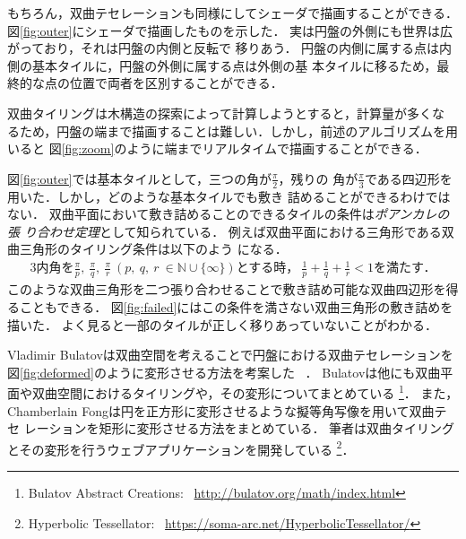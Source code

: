 もちろん，双曲テセレーションも同様にしてシェーダで描画することができる．
図\ref{fig:outer}にシェーダで描画したものを示した．
実は円盤の外側にも世界は広がっており，それは円盤の内側と反転で
移りあう．
円盤の内側に属する点は内側の基本タイルに，円盤の外側に属する点は外側の基
本タイルに移るため，最終的な点の位置で両者を区別することができる．

双曲タイリングは木構造の探索によって計算しようとすると，計算量が多くな
るため，円盤の端まで描画することは難しい．しかし，前述のアルゴリズムを用いると
図\ref{fig:zoom}のように端までリアルタイムで描画することができる．

図\ref{fig:outer}では基本タイルとして，三つの角が$\frac{\pi}{2}$，残りの
角が$\frac{\pi}{3}$である四辺形を用いた．しかし，どのような基本タイルでも敷き
詰めることができるわけではない．
双曲平面において敷き詰めることのできるタイルの条件は\emph{ポアンカレの張
り合わせ定理}として知られている．
例えば双曲平面における三角形である双曲三角形のタイリング条件は以下のよう
になる．
\begin{eqnarray*}
3\text{内角を}\frac{\pi}{p},~\frac{\pi}{q},~\frac{\pi}{r}~(p,~q,~r~\in
 \mathbb{N} \cup \{\infty\}) \text{とする時，}~
 \frac{1}{p} + \frac{1}{q} + \frac{1}{r} < 1 \text{を満たす．}
\end{eqnarray*}
このような双曲三角形を二つ張り合わせることで敷き詰め可能な双曲四辺形を得
ることもできる．
図\ref{fig:failed}にはこの条件を満さない双曲三角形の敷き詰めを描いた．
よく見ると一部のタイルが正しく移りあっていないことがわかる．

Vladimir Bulatovは双曲空間を考えることで円盤における双曲テセレーションを
図\ref{fig:deformed}のように変形させる方法を考案した\cite{bridges2013-167}
~\cite{bridges2011-479}．
Bulatovは他にも双曲平面や双曲空間におけるタイリングや，その変形についてまとめている
\footnote{Bulatov Abstract Creations:~
\url{http://bulatov.org/math/index.html}}．
また，Chamberlain Fongは円を正方形に変形させるような擬等角写像を用いて双曲テセ
レーションを矩形に変形させる方法をまとめている\cite{bridges2016-179}．
筆者は双曲タイリングとその変形を行うウェブアプリケーションを開発している
\footnote{Hyperbolic Tessellator:~
\url{https://soma-arc.net/HyperbolicTessellator/}}．

